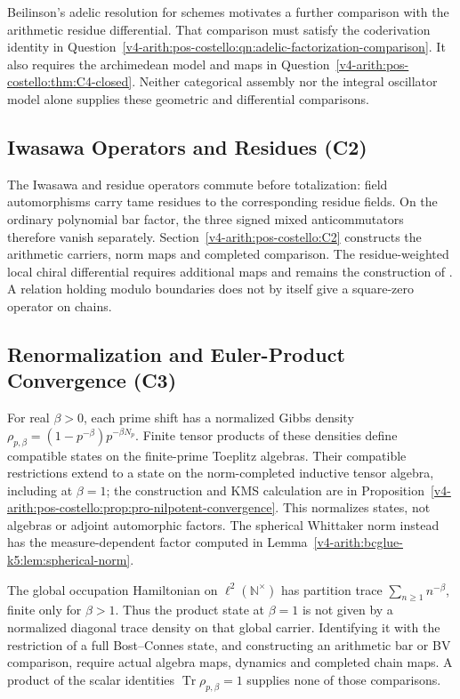Beilinson's adelic resolution for schemes motivates a further
comparison with the arithmetic residue differential. That
comparison must satisfy the coderivation identity in
Question~\ref{v4-arith:pos-costello:qn:adelic-factorization-comparison}.
It also requires the archimedean model and maps in
Question~\ref{v4-arith:pos-costello:thm:C4-closed}.
Neither categorical assembly nor the integral oscillator model
alone supplies these geometric and differential comparisons.

\subsection{Iwasawa Operators and Residues (C2)}

The Iwasawa and residue operators commute before totalization:
field automorphisms carry tame residues to the corresponding residue
fields. On the ordinary polynomial bar factor, the three signed mixed
anticommutators therefore vanish separately.
Section~\ref{v4-arith:pos-costello:C2} constructs the arithmetic
carriers, norm maps and completed comparison. The residue-weighted
local chiral differential requires additional maps and remains the
construction of .
A relation holding modulo boundaries does not by itself give a
square-zero operator on chains.

\subsection{Renormalization and Euler-Product Convergence (C3)}

For real \(\beta>0\), each prime shift has a normalized Gibbs
density \(\rho_{p,\beta}=(1-p^{-\beta})p^{-\beta N_p}\).
Finite tensor products of these densities define compatible states
on the finite-prime Toeplitz algebras. Their compatible restrictions
extend to a state on the norm-completed inductive tensor algebra,
including at \(\beta=1\); the construction and KMS calculation are
in Proposition~\ref{v4-arith:pos-costello:prop:pro-nilpotent-convergence}.
This normalizes states, not algebras or adjoint automorphic factors.
The spherical Whittaker norm instead has the measure-dependent
factor computed in Lemma~\ref{v4-arith:bcglue-k5:lem:spherical-norm}.

The global occupation Hamiltonian on \(\ell^2(\mathbb N^\times)\)
has partition trace \(\sum_{n\geq1}n^{-\beta}\), finite only for
\(\beta>1\). Thus the product state at \(\beta=1\) is not given
by a normalized diagonal trace density on that global carrier.
Identifying it with the restriction of a full Bost--Connes state,
and constructing an arithmetic bar or BV comparison, require actual
algebra maps, dynamics and completed chain maps. A product of the
scalar identities \(\operatorname{Tr}\rho_{p,\beta}=1\) supplies
none of those comparisons.

